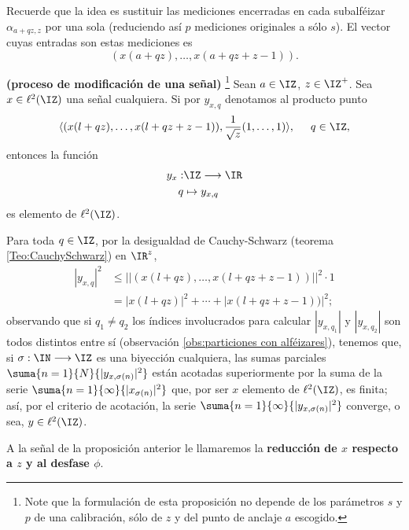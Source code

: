 \noindent Recuerde que la idea es sustituir las mediciones
encerradas en cada subalféizar $\alpha_{a+qz,z}$ por una sola
(reduciendo así $p$ mediciones originales a sólo $s$).
El vector cuyas entradas son estas mediciones es
\[
(x(a+qz), \ldots , x(a+qz+z-1)).
\]


\begin{prop} \textbf{(proceso de modificación de una señal)}
\label{prop: modificacion senial}
\footnote{Note que
la formulación de esta proposición no depende de los parámetros
$s$ y $p$ de una calibración, sólo de $z$ y del
punto de anclaje $a$ escogido.} Sean 
$a \in\IZ$, $z \in \IZ^{+}$.
Sea $x \in \ell^{2}(\IZ)$ una señal cualquiera. Si
por $y_{x,q}$ denotamos al producto punto
\[
\langle (x(l+qz), \ldots , x(l+qz+z-1)) , 
 \frac{1}{\sqrt{z}} (1, \ldots ,1) \rangle,  
\hspace{0.5cm} q \in \IZ ,
\]
entonces la función 
\begin{align*}
y_{x}: & \IZ \longrightarrow \IR \\
q & \mapsto y_{x,q}
\end{align*}
es elemento de $\ell^{2}(\IZ)$.
\end{prop}
\begin{dem}
Para toda $q \in \IZ$, por la desigualdad de Cauchy-Schwarz
(teorema \ref{Teo:CauchySchwarz})
en $\IR^{z}$,
\begin{align*}
|y_{x,q}|^{2} & \leq ||(x(l+qz), \ldots , x(l+qz+z-1))||^{2} 
\cdot 1 \\
& = |x(l+qz)|^{2} + \cdots + |x(l+qz+z-1))|^{2};
\end{align*}
\noindent
observando que si $q_{1} \neq q_{2}$ los índices
involucrados para calcular $|y_{x, q_{1}}|$ y 
$|y_{x, q_{2}}|$ son todos distintos entre sí
(observación \ref{obs:particiones con alféizares}), tenemos que,
si $\sigma : \IN \longrightarrow \IZ$ 
es una biyección cualquiera,
las sumas parciales $\suma{n=1}{N}{|y_{x, \sigma(n)}|^{2}}$
están acotadas superiormente por
la suma de la serie $\suma{n=1}{\infty}{|x_{\sigma(n)}|^{2}}$
que, por ser $x$ elemento de $\ell^{2}(\IZ)$, es finita;
así,
por el criterio de acotación, la serie 
$\suma{n=1}{\infty}{|y_{x, \sigma(n)}|^{2}}$ converge, o sea,
$y \in \ell^{2}(\IZ)$.
\QEDB
\end{dem}


\begin{defi}
A la señal de la proposición anterior
le llamaremos la \textbf{reducción
de $x$ respecto a $z$ y al desfase $\phi$}. 
\end{defi}


